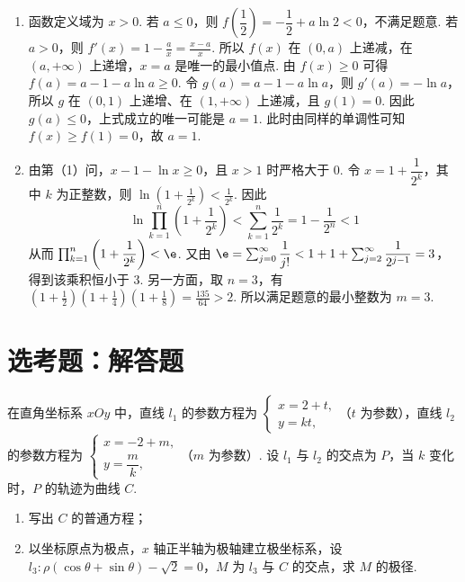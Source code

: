 \begin{solution}
\begin{enumerate}
\item 函数定义域为 \(x>0\). 若 \(a\le0\)，则 \(f\left(\dfrac12\right)=-\dfrac12+a\ln2<0\)，不满足题意. 若 \(a>0\)，则 \(f'(x)=1-\frac ax=\frac{x-a}{x}\).
所以 \(f(x)\) 在 \((0,a)\) 上递减，在 \((a,+\infty)\) 上递增，\(x=a\) 是唯一的最小值点. 由 \(f(x)\ge0\) 可得 \(f(a)=a-1-a\ln a\ge0\). 令 \(g(a)=a-1-a\ln a\)，则 \(g'(a)=-\ln a\)，所以 \(g\) 在 \((0,1)\) 上递增、在 \((1,+\infty)\) 上递减，且 \(g(1)=0\). 因此 \(g(a)\le0\)，上式成立的唯一可能是 \(a=1\). 此时由同样的单调性可知 \(f(x)\ge f(1)=0\)，故 \(a=1\).
\item 由第（1）问，\(x-1-\ln x\ge0\)，且 \(x>1\) 时严格大于 \(0\). 令 \(x=1+\dfrac1{2^k}\)，其中 \(k\) 为正整数，则 \(\ln\left(1+\frac1{2^k}\right)<\frac1{2^k}\).
因此
\[
\ln\prod_{k=1}^n\left(1+\frac1{2^k}\right)<\sum_{k=1}^n\frac1{2^k}=1-\frac1{2^n}<1
\]
从而 \(\prod_{k=1}^n\left(1+\dfrac1{2^k}\right)<\e\). 又由 \(\e=\sum_{j=0}^{\infty}\dfrac1{j!}<1+1+\sum_{j=2}^{\infty}\dfrac1{2^{j-1}}=3\)，得到该乘积恒小于 \(3\). 另一方面，取 \(n=3\)，有 \(\left(1+\frac12\right)\left(1+\frac14\right)\left(1+\frac18\right)=\frac{135}{64}>2\).
所以满足题意的最小整数为 \(m=3\).
\end{enumerate}
\end{solution}

\section{选考题：解答题}

\begin{problem}
在直角坐标系 \(xOy\) 中，直线 \(l_1\) 的参数方程为
\(\begin{cases}
x=2+t,\\
y=kt,
\end{cases}\)（\(t\) 为参数），直线 \(l_2\) 的参数方程为
\(\begin{cases}
x=-2+m,\\
y=\dfrac{m}{k},
\end{cases}\)（\(m\) 为参数）. 设 \(l_1\) 与 \(l_2\) 的交点为 \(P\)，当 \(k\) 变化时，\(P\) 的轨迹为曲线 \(C\).

\begin{enumerate}
\item 写出 \(C\) 的普通方程；
\item 以坐标原点为极点，\(x\) 轴正半轴为极轴建立极坐标系，设 \(l_3:\rho(\cos\theta+\sin\theta)-\sqrt2=0\)，\(M\) 为 \(l_3\) 与 \(C\) 的交点，求 \(M\) 的极径.
\end{enumerate}
\end{problem}

